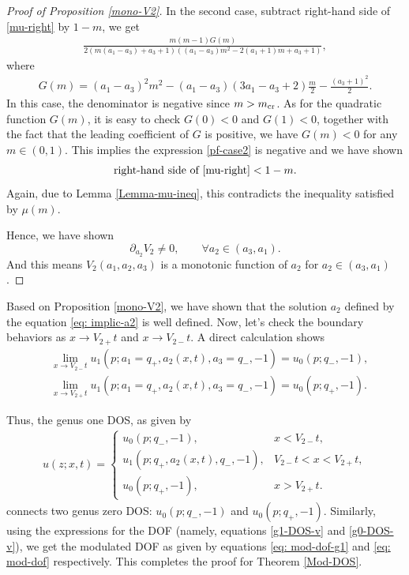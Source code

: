 \documentclass[10pt,a4paper]{amsart}
\numberwithin{equation}{section}
\def\ra{\rightarrow}
\begin{document}
\begin{proof}[Proof of Proposition \ref{mono-V2}]
In the second case, subtract right-hand side of \eqref{mu-right} by $1-m$, we get
\begin{align}
\frac{m(m-1) G(m)}{2(m(a_1-a_3)+a_3+1)((a_1-a_3)m^2-2(a_1+1)m+a_3+1)},\label{pf-case2}
\end{align}
where \begin{align*}
G(m)=(a_1-a_3)^2m^2-(a_1-a_3)(3a_1-a_3+2)\frac{m}{2}-\frac{(a_3+1)^2}{2}.
\end{align*}
In this case, the denominator is negative since $m>m_{\rm cr}$. As for the quadratic function $G(m)$, it is easy to check $G(0)<0$ and $G(1)<0$, together with the fact that the leading coefficient of $G$ is positive, we have $G(m)<0$ for any $m\in (0,1)$. This implies the expression \eqref{pf-case2} is negative and we have shown
\begin{align*}
\text{right-hand side of \eqref{mu-right}}<1-m.
\end{align*}
Again, due to Lemma \ref{Lemma-mu-ineq}, this contradicts the inequality satisfied by $\mu(m)$.

Hence, we have shown
\[\partial_{a_2}V_2\neq 0,\qquad \forall a_2\in (a_3,a_1).\]
And this means $V_2(a_1,a_2,a_3)$ is a monotonic function of $a_2$ for $a_2\in (a_3,a_1)$.
\end{proof}

Based on Proposition \ref{mono-V2}, we have shown that the solution $a_2$ defined by the equation \eqref{eq: implic-a2} is well defined. Now, let's check the boundary behaviors as $x\ra V_{2+}t$ and $x\ra V_{2-}t$. A direct calculation shows
\begin{align*}
&\lim_{x\ra V_{2-}t}u_1(p;a_1=q_+,a_2(x,t),a_3=q_-,-1)=u_0(p;q_-,-1),\\
&\lim_{x\ra V_{2+}t}u_1(p;a_1=q_+,a_2(x,t),a_3=q_-,-1)=u_0(p;q_+,-1).
\end{align*}

Thus, the genus one DOS, as given by
\begin{align*}
u(z;x,t)=\begin{cases}
u_0(p;q_-,-1),& x<V_{2-}t,\\
u_1(p;q_+,a_2(x,t),q_-,-1),& V_{2-}t<x<V_{2+}t,\\
u_0(p;q_+,-1),& x>V_{2+}t.
\end{cases}%
\end{align*}
connects two genus zero DOS: $u_0(p;q_-,-1)$ and $u_0(p;q_+,-1)$. Similarly, using the expressions for the DOF (namely, equations \eqref{g1-DOS-v} and \eqref{g0-DOS-v}), we get the modulated DOF as given by equations \eqref{eq: mod-dof-g1} and \eqref{eq: mod-dof} respectively. This completes the proof for Theorem \ref{Mod-DOS}.
\end{document}
